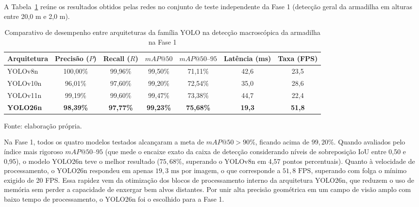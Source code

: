 A Tabela~\ref{tab:comparativo_yolo_fase1_resultados} reúne os resultados obtidos pelas redes no conjunto de teste independente da Fase 1 (detecção geral da armadilha em alturas entre 20,0 m e 2,0 m).

\begin{table}[H]
	\centering
	\footnotesize
	\setlength{\tabcolsep}{3.5pt}
	\captionsetup{justification=centering}
	\caption{Comparativo de desempenho entre arquiteturas da família YOLO na detecção macroscópica da armadilha na Fase 1}
	\label{tab:comparativo_yolo_fase1_resultados}
	\vspace{0.2cm}
	\begin{tabular}{lcccccc}
		\hline
		\textbf{Arquitetura} & \textbf{Precisão ($P$)} & \textbf{Recall ($R$)} & \textbf{$mAP@50$} & \textbf{$mAP@50\text{--}95$} & \textbf{Latência (ms)} & \textbf{Taxa (FPS)} \\
		\hline
		YOLOv8n    & 100,00\%     & 99,96\%    & 99,50\%    & 71,11\%         & 42,6           & 23,5 \\
		YOLOv10n   & 96,01\%      & 97,60\%    & 99,20\%    & 72,54\%         & 35,0           & 28,6 \\
		YOLOv11n   & 99,19\%      & 99,60\%    & 99,47\%    & 73,38\%         & 44,7           & 22,4 \\
		\textbf{YOLO26n} & \textbf{98,39\%} & \textbf{97,77\%} & \textbf{99,23\%} & \textbf{75,68\%} & \textbf{19,3} & \textbf{51,8} \\
		\hline
	\end{tabular}
	\vspace{0.2cm}
	\begin{flushleft}
		\footnotesize Fonte: elaboração própria.
	\end{flushleft}
\end{table}

Na Fase 1, todos os quatro modelos testados alcançaram a meta de $mAP@50 > 90\%$, ficando acima de $99,20\%$. Quando avaliados pelo índice mais rigoroso $mAP@50\text{--}95$ (que mede o encaixe exato da caixa de detecção considerando níveis de sobreposição IoU entre 0,50 e 0,95), o modelo YOLO26n teve o melhor resultado ($75,68\%$, superando o YOLOv8n em 4,57 pontos percentuais). Quanto à velocidade de processamento, o YOLO26n respondeu em apenas $19,3\text{ ms}$ por imagem, o que corresponde a $51,8\text{ FPS}$, superando com folga o mínimo exigido de 20 FPS. Essa rapidez vem da otimização dos blocos de processamento interno da arquitetura YOLO26n, que reduzem o uso de memória sem perder a capacidade de enxergar bem alvos distantes. Por unir alta precisão geométrica em um campo de visão amplo com baixo tempo de processamento, o YOLO26n foi o escolhido para a Fase 1.

